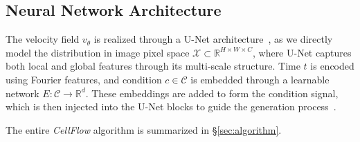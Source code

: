 \subsection{Neural Network Architecture}
The velocity field $v_\theta$ is realized through a U-Net architecture~\cite{ronneberger2015u}, as we directly model the distribution in image pixel space $\mathcal{X} \subset \mathbb{R}^{H\times W\times C}$, where U-Net captures both local and global features through its multi-scale structure. Time $t$ is encoded using Fourier features, and condition $c \in \mathcal{C}$ is embedded through a learnable network $E: \mathcal{C} \rightarrow \mathbb{R}^d$. These embeddings are added to form the condition signal, which is then injected into the U-Net blocks to guide the generation process~\cite{esser2024scaling}. 

The entire \emph{CellFlow} algorithm is summarized in \S\ref{sec:algorithm}.
